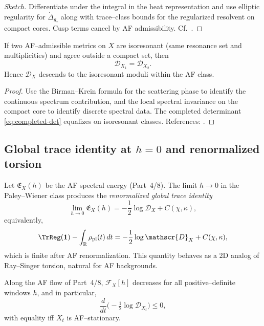 \begin{proof}[Sketch]
Differentiate under the integral in the heat representation and use elliptic regularity for $\dot{\Delta}_{g_\tau}$ along with trace–class bounds for the regularized resolvent on compact cores. Cusp terms cancel by AF admissibility. Cf.\ \cite{Osgood1988}. %
\end{proof}

\begin{theorem}
\label{thm:isoresonant}
If two AF–admissible metrics on $X$ are isoresonant (same resonance set and multiplicities) and agree outside a compact set, then
\[
\mathscr{D}_{X_1}=\mathscr{D}_{X_2}.
\]
Hence $\mathscr{D}_X$ descends to the isoresonant moduli within the AF class.
\end{theorem}

\begin{proof}
Use the Birman–Krein formula for the scattering phase to identify the continuous spectrum contribution, and the local spectral invariance on the compact core to identify discrete spectral data. The completed determinant \eqref{eq:completed-det} equalizes on isoresonant classes. References: \cite{GuillopeZworski,Borthwick}. %
\end{proof}

\subsection{Global trace identity at $h=0$ and renormalized torsion}
\label{subsec:torsion}
\relax\hspace{0pt}

Let $\mathfrak{E}_X(h)$ be the AF spectral energy (Part~4/8). The limit $h\to 0$ in the Paley–Wiener class produces the \emph{renormalized global trace identity}
\begin{equation}\label{eq:global-trace-zero}
\lim_{h\to 0}\mathfrak{E}_X(h)
= -\frac12\log\mathscr{D}_X + C(\chi,\kappa),
\end{equation}
equivalently,
\[
\TrReg(\mathbf{1}) - \int_{\mathbb{R}}\rho_{\mathrm{pl}}(t)\,dt
= -\frac12\log\mathscr{D}_X + C(\chi,\kappa),
\]
which is finite after AF renormalization. This quantity behaves as a 2D analog of Ray–Singer torsion, natural for AF backgrounds.

\begin{corollary}
\label{cor:monotonicity}
Along the AF flow of Part~4/8, $\mathcal{F}_X[h]$ decreases for all positive–definite windows $h$, and in particular,
\[
\frac{d}{dt}\Big(-\tfrac12\log\mathscr{D}_{X_t}\Big)\le 0,
\]
with equality iff $X_t$ is AF–stationary. %
\end{corollary}

